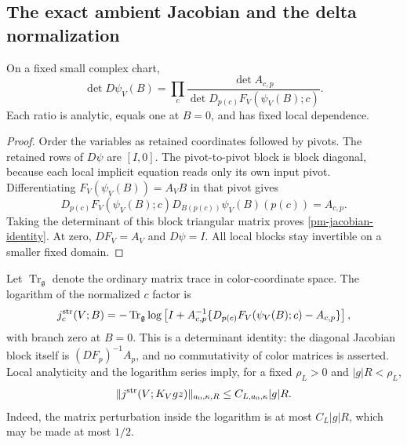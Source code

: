\subsection{The exact ambient Jacobian and the delta normalization}
\label{pm-jacobian-section}

\begin{lemma}\label{pm-jacobian-lemma}
On a fixed small complex chart,
\begin{equation}\label{pm-jacobian-identity}
 \det D\psi_V(B)=\prod_c
 \frac{\det A_{c,p}}
      {\det D_{p(c)}F_V(\psi_V(B);c)}.
\end{equation}
Each ratio is analytic, equals one at $B=0$, and has fixed
local dependence.
\end{lemma}
\begin{proof}
Order the variables as retained coordinates followed by
pivots. The retained rows of $D\psi$ are $[I,0]$.
The pivot-to-pivot block is block diagonal, because each local
implicit equation reads only its own input pivot. Differentiating
$F_V(\psi_V(B))=A_VB$ in that pivot gives
\[
 D_{p(c)}F_V(\psi_V(B);c)
 D_{B(p(c))}\psi_V(B)(p(c))=A_{c,p}.
\]
Taking the determinant of this block triangular matrix proves
\eqref{pm-jacobian-identity}. At zero, $DF_V=A_V$ and
$D\psi=I$. All local blocks stay invertible on a smaller
fixed domain.
\end{proof}

Let $\operatorname{Tr}_{\mathfrak g}$ denote the ordinary
matrix trace in color-coordinate space. The logarithm of the
normalized $c$ factor is
\begin{equation}\label{pm-jacobian-log}
 j_c^{\rm str}(V;B)=
 -\operatorname{Tr}_{\mathfrak g}\log\left[
 I+A_{c,p}^{-1}
 \{D_{p(c)}F_V(\psi_V(B);c)-A_{c,p}\}\right],
\end{equation}
with branch zero at $B=0$. This is a determinant identity:
the diagonal Jacobian block itself is $(DF_p)^{-1}A_p$,
and no commutativity of color matrices is asserted.
Local analyticity and the logarithm series imply, for a fixed
$\rho_L>0$ and $|g|R<\rho_L$,
\begin{equation}\label{pm-jacobian-bound}
 \|j^{\rm str}(V;K_Vgz)\|_{a_0,\kappa,R}
 \le C_{L,a_0,\kappa}|g|R.
\end{equation}
Indeed, the matrix perturbation inside the logarithm is at
most $C_L|g|R$, which may be made at most $1/2$.

